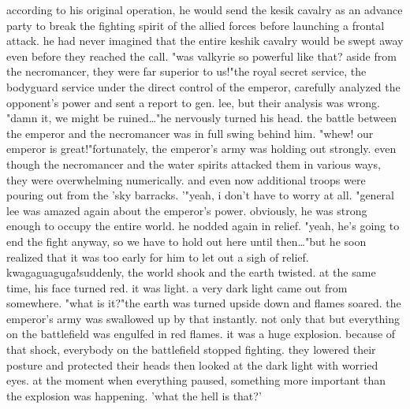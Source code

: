 according to his original operation, he would send the kesik cavalry as an advance party to break the fighting spirit of the allied forces before launching a frontal attack.
he had never imagined that the entire keshik cavalry would be swept away even before they reached the call.
"was valkyrie so powerful like that? aside from the necromancer, they were far superior to us!"the royal secret service, the bodyguard service under the direct control of the emperor, carefully analyzed the opponent's power and sent a report to gen.
 lee, but their analysis was wrong.
 "damn it, we might be ruined…"he nervously turned his head.
 the battle between the emperor and the necromancer was in full swing behind him.
 "whew! our emperor is great!"fortunately, the emperor's army was holding out strongly.
even though the necromancer and the water spirits attacked them in various ways, they were overwhelming numerically.
 and even now additional troops were pouring out from the 'sky barracks.
'"yeah, i don't have to worry at all.
"general lee was amazed again about the emperor's power.
 obviously, he was strong enough to occupy the entire world.
 he nodded again in relief.
"yeah, he's going to end the fight anyway, so we have to hold out here until then…"but he soon realized that it was too early for him to let out a sigh of relief.
kwagaguaguga!suddenly, the world shook and the earth twisted.
 at the same time, his face turned red.
it was light.
 a very dark light came out from somewhere.
 "what is it?"the earth was turned upside down and flames soared.
 the emperor's army was swallowed up by that instantly.
 not only that but everything on the battlefield was engulfed in red flames.
it was a huge explosion.
 because of that shock, everybody on the battlefield stopped fighting.
 they lowered their posture and protected their heads then looked at the dark light with worried eyes.
 at the moment when everything paused, something more important than the explosion was happening.
'what the hell is that?'

 